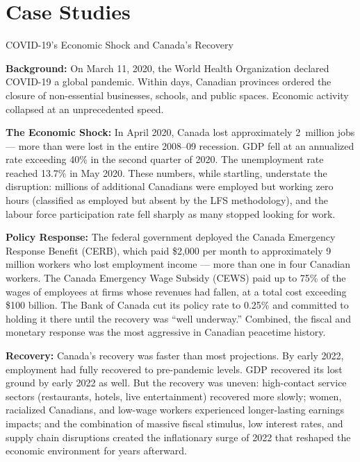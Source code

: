 \section{Case Studies}
\label{sec:ch1_casestudies}

\begin{casestudy}{COVID-19's Economic Shock and Canada's Recovery}

\textbf{Background:} On March 11, 2020, the World Health Organization
declared COVID-19 a global pandemic. Within days, Canadian provinces
ordered the closure of non-essential businesses, schools, and public
spaces. Economic activity collapsed at an unprecedented speed.

\textbf{The Economic Shock:} In April 2020, Canada lost approximately
2~million jobs --- more than were lost in the entire 2008--09 recession.
GDP fell at an annualized rate exceeding 40\% in the second quarter of 2020.
The unemployment rate reached 13.7\% in May 2020. These numbers, while
startling, understate the disruption: millions of additional Canadians
were employed but working zero hours (classified as employed but absent
by the LFS methodology), and the labour force participation rate fell
sharply as many stopped looking for work.

\textbf{Policy Response:} The federal government deployed the Canada Emergency
Response Benefit (CERB), which paid \$2,000 per month to approximately
9 million workers who lost employment income --- more than one in four
Canadian workers. The Canada Emergency Wage Subsidy (CEWS) paid up to
75\% of the wages of employees at firms whose revenues had fallen, at a
total cost exceeding \$100 billion. The Bank of Canada cut its policy
rate to 0.25\% and committed to holding it there until the recovery was
``well underway.'' Combined, the fiscal and monetary response was the
most aggressive in Canadian peacetime history.

\textbf{Recovery:} Canada's recovery was faster than most projections.
By early 2022, employment had fully recovered to pre-pandemic levels.
GDP recovered its lost ground by early 2022 as well. But the recovery
was uneven: high-contact service sectors (restaurants, hotels, live
entertainment) recovered more slowly; women, racialized Canadians, and
low-wage workers experienced longer-lasting earnings impacts; and the
combination of massive fiscal stimulus, low interest rates, and supply
chain disruptions created the inflationary surge of 2022 that reshaped
the economic environment for years afterward.


\end{casestudy}
